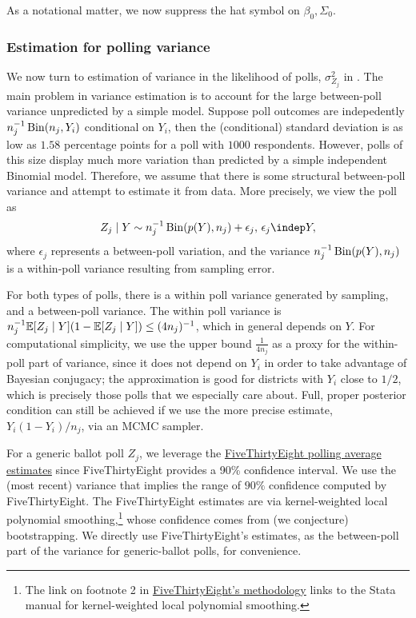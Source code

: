 \documentclass[12pt, letterpaper]{article}
\begin{document}
As a notational matter, we now suppress the hat symbol on $\beta_0, \Sigma_0.$

\subsubsection{Estimation for polling variance}
\label{subsub:var_poll}
We now turn to estimation of variance in the likelihood of polls, $\sigma_{Z_j}^2$ in . The main problem in variance estimation is to account for the large between-poll variance unpredicted by a simple model. Suppose poll outcomes are indepedently $n_j^{-1} \operatorname{Bin}(n_j, Y_i)$ conditional on $Y_i$, then the (conditional) standard deviation is as low as $1.58$ percentage points for a poll with $1000$ respondents. However, polls of this size display much more variation than predicted by a simple independent Binomial model. Therefore, we assume that there is some structural between-poll variance and attempt to estimate it from data. More precisely, we view the poll as \[
Z_j \mid Y \sim n_j^{-1}\Bin(p(Y), n_j) + \epsilon_j, \, \epsilon_j \indep Y,
\]
where $\epsilon_j$ represents a between-poll variation, and the variance $n_j^{-1}\operatorname{Bin}(p(Y), n_j) $ is a within-poll variance resulting from sampling error.  

For both types of polls, there is a within poll variance generated by sampling, and a between-poll variance. The within poll variance is $n_j^{-1}\mathbb{E}[Z_j \mid Y](1-\mathbb{E}[Z_j\mid Y]) \le (4n_j)^{-1}$, which in general depends on $Y$. For computational simplicity, we use the upper bound $\frac{1}{4n_j}$ as a proxy for the within-poll part of variance, since it does not depend on $Y_i$ in order to take advantage of Bayesian conjugacy; the approximation is good for districts with $Y_i$ close to $1/2$, which is precisely those polls that we especially care about. Full, proper posterior condition can still be achieved if we use the more precise estimate, $Y_i(1-Y_i)/n_j$, via an MCMC sampler. 

For a generic ballot poll $Z_j$, we leverage the \href{https://projects.fivethirtyeight.com/congress-generic-ballot-polls/}{FiveThirtyEight polling average estimates} since FiveThirtyEight provides a 90\% confidence interval. We use the (most recent) variance that implies the range of $90\%$ confidence computed by FiveThirtyEight. The FiveThirtyEight estimates are via kernel-weighted local polynomial smoothing,\footnote{The link on footnote 2 in \href{https://fivethirtyeight.com/features/heres-a-new-less-volatile-version-of-our-generic-ballot-tracker/}{FiveThirtyEight's methodology} links to the Stata manual for kernel-weighted local polynomial smoothing.} whose confidence comes from (we conjecture) bootstrapping. We directly use FiveThirtyEight's estimates, as the between-poll part of the variance for generic-ballot polls, for convenience. 
\end{document}

